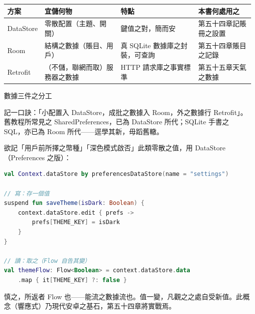 


\begin{center}
\begin{tabularx}{\linewidth}{|X|X|X|X|}
\hline
\textbf{方案} & \textbf{宜儲何物} & \textbf{特點} & \textbf{本書何處用之} \tabularnewline
\hline
DataStore & 零散配置（主題、開關） & 鍵值之對，簡而安 & 第五十四章記賬冊之設置 \tabularnewline
Room & 結構之數據（賬目、用戶） & 真 SQLite 數據庫之封裝，可查詢 & 第五十四章賬目之記錄 \tabularnewline
Retrofit & （不儲，聯網而取）服務器之數據 & HTTP 請求庫之事實標準 & 第五十五章天氣之數據 \tabularnewline
\hline
\end{tabularx}
\end{center}

\begin{center}\small\color{gray}數據三件之分工\end{center}

記一口訣：「小配置入 DataStore，成批之數據入 Room，外之數據行 Retrofit」。舊教程所常見之 SharedPreferences，已為 DataStore 所代；SQLite 手書之 SQL，亦已為 Room 所代——逕學其新，毋蹈舊轍。


欲記「用戶前所擇之幣種」「深色模式啟否」此類零散之值，用 DataStore（Preferences 之版）：

\begin{lstlisting}[language=Kotlin]
val Context.dataStore by preferencesDataStore(name = "settings")

// 寫：存一個值
suspend fun saveTheme(isDark: Boolean) {
    context.dataStore.edit { prefs ->
        prefs[THEME_KEY] = isDark
    }
}

// 讀：取之（Flow 自告其變）
val themeFlow: Flow<Boolean> = context.dataStore.data
    .map { it[THEME_KEY] ?: false }
\end{lstlisting}

慎之，所返者 Flow 也——能流之數據流也。值一變，凡觀之之處自受新值。此概念（響應式）乃現代安卓之基石，第五十四章將實戰焉。


